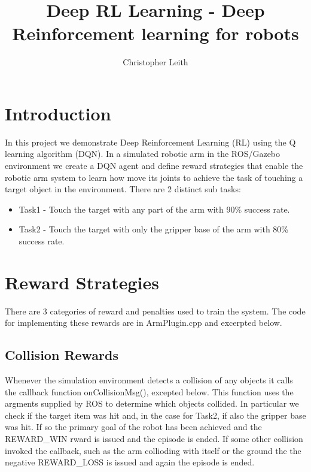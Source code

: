 \documentclass[10pt]{article}
\begin{document}
\title{Deep RL Learning - Deep Reinforcement learning for robots}
\author{Christopher Leith}
\maketitle

\label{sec:Introduction}
\section{Introduction}

In this project we demonstrate Deep Reinforcement Learning (RL) using the Q learning algorithm (DQN). 
In a simulated robotic arm in the ROS/Gazebo environment we create a DQN agent and  define reward 
strategies that enable the robotic arm system to learn how move its joints to achieve the task of touching 
a target object in the environment. There are 2 distinct sub tasks:

\begin{itemize}
 \item Task1 -
 Touch the target with any part of the arm with 90\% success rate.
 \item Task2 - 
 Touch the target with only the gripper base of the arm with 80\% success rate.
\end{itemize}

\section{Reward Strategies}
There are 3 categories of reward and penalties used to train the system. The code for implementing
these rewards are in ArmPlugin.cpp and excerpted below.

\subsection{Collision Rewards}
Whenever the simulation environment detects a collision of any objects it calls the callback function
onCollisionMsg(), excepted below. This function uses the argments supplied by ROS to determine which objects
collided. In particular we check if the target item was hit and, in the case for Task2, if also the gripper base
was hit. If so the primary goal of the robot has been achieved and the REWARD\_WIN rward is issued and the episode
is ended. If some other collision invoked the callback, such as the arm collioding with itself or the ground
the the negative REWARD\_LOSS is issued and again the episode is ended.
 
\end{document}
